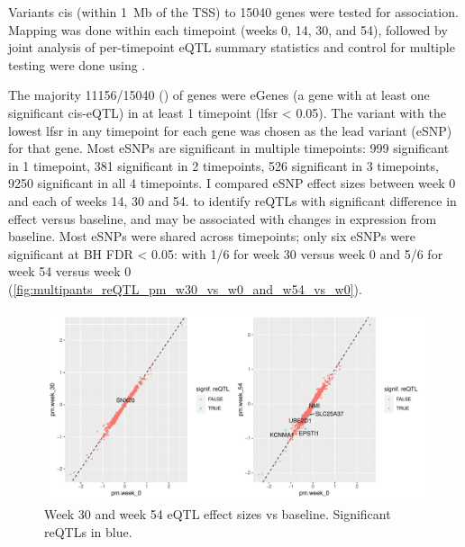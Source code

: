 \begin{outline}
Variants cis (within \SI{1}{\mega b} of the TSS) to 15040 genes were tested for association.
Mapping was done within each timepoint (weeks 0, 14, 30, and 54),
followed by joint analysis of per-timepoint \gls{eQTL} summary statistics and control for multiple testing were done using .

The majority 11156/15040 () of genes were eGenes (a gene with at least one significant cis-eQTL) in at least 1 timepoint (lfsr < 0.05).
The variant with the lowest lfsr in any timepoint for each gene was 
chosen as the lead variant (eSNP) for that gene.
Most eSNPs are significant in multiple timepoints: 999 significant in 1 timepoint, 381 significant in 2 timepoints, 526 significant in 3 timepoints, 9250 significant in all 4 timepoints.
I compared eSNP effect sizes between week 0 and each of weeks 14, 30 and 54.
to identify \glspl{reQTL} with significant difference in effect versus baseline,
and may be associated with changes in expression from baseline.
Most eSNPs were shared across timepoints;
only six eSNPs were significant at BH FDR < 0.05:
with 1/6 for week 30 versus week 0 and 5/6 for week 54 versus week 0 (\autoref{fig:multipants_reQTL_pm_w30_vs_w0_and_w54_vs_w0}).


\begin{figure}
    \centering
    \includegraphics[width=1.0\textwidth,page=1]{mainmatter/figures/chapter_04/plot_dge_eqtl.pm_w30_vs_w0_and_w54_vs_w0}
    \caption{Week 30 and week 54 eQTL effect sizes vs baseline. Significant reQTLs in blue.}
    \label{fig:multipants_reQTL_pm_w30_vs_w0_and_w54_vs_w0}
\end{figure}


\end{outline}
